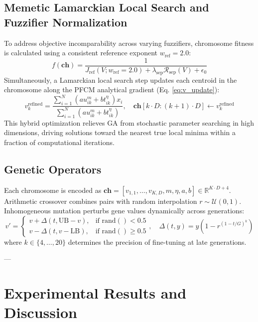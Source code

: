 \documentclass[preprint,12pt]{elsarticle}
\begin{document}
\subsection{Memetic Lamarckian Local Search and Fuzzifier Normalization}
To address objective incomparability across varying fuzzifiers, chromosome fitness is calculated using a consistent reference exponent $w_{\text{ref}} = 2.0$:
\begin{equation}
f(\mathbf{ch}) = \frac{1}{J_{\text{ref}}(V; w_{\text{ref}}=2.0) + \lambda_{\text{sep}} \mathcal{R}_{\text{sep}}(V) + \epsilon_0}
\label{eq:memetic_fitness}
\end{equation}
Simultaneously, a Lamarckian local search step updates each centroid in the chromosome along the PFCM analytical gradient (Eq. \ref{eq:v_update}):
\begin{equation}
v_k^{\text{refined}} = \frac{\sum_{i=1}^N (a u_{ik}^m + b t_{ik}^\eta) x_i}{\sum_{i=1}^N (a u_{ik}^m + b t_{ik}^\eta)}, \quad \mathbf{ch}[k \cdot D : (k+1) \cdot D] \leftarrow v_k^{\text{refined}}
\end{equation}
This hybrid optimization relieves GA from stochastic parameter searching in high dimensions, driving solutions toward the nearest true local minima within a fraction of computational iterations.

\subsection{Genetic Operators}
Each chromosome is encoded as $\mathbf{ch} = [v_{1,1}, \dots, v_{K,D}, m, \eta, a, b] \in \mathbb{R}^{K \cdot D + 4}$. Arithmetic crossover combines pairs with random interpolation $r \sim \mathcal{U}(0, 1)$. Inhomogeneous mutation \cite{kuo2023density} perturbs gene values dynamically across generations:
\begin{equation}
v' = \begin{cases}
v + \Delta(t, \text{UB} - v), & \text{if } \text{rand}() < 0.5 \\
v - \Delta(t, v - \text{LB}), & \text{if } \text{rand}() \ge 0.5
\end{cases}, \quad \Delta(t, y) = y \left(1 - r^{(1 - t/G)^k}\right)
\label{eq:inhomogeneous}
\end{equation}
where $k \in \{4, \dots, 20\}$ determines the precision of fine-tuning at late generations.

---

\section{Experimental Results and Discussion}
\label{sec:experiments}
\end{document}
